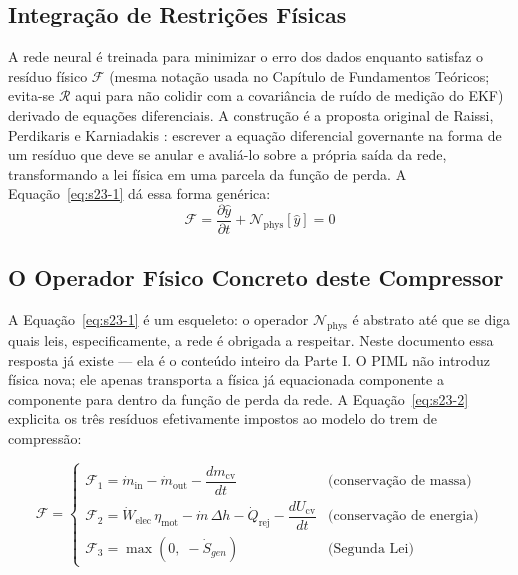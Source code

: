 \documentclass[12pt,a4paper]{article}
\numberwithin{equation}{section}
\numberwithin{table}{section}
\numberwithin{figure}{section}
\begin{document}
	\subsection{Integração de Restrições Físicas}
	A rede neural é treinada para minimizar o erro dos dados enquanto satisfaz o resíduo físico $\mathcal{F}$ (mesma notação usada no Capítulo de Fundamentos Teóricos; evita-se $\mathcal{R}$ aqui para não colidir com a covariância de ruído de medição do EKF) derivado de equações diferenciais. A construção é a proposta original de Raissi, Perdikaris e Karniadakis \cite{piml}: escrever a equação diferencial governante na forma de um resíduo que deve se anular e avaliá-lo sobre a própria saída da rede, transformando a lei física em uma parcela da função de perda. A Equação~\eqref{eq:s23-1} dá essa forma genérica:
	\begin{equation}\label{eq:s23-1}
 \mathcal{F} = \frac{\partial \hat{y}}{\partial t} + \mathcal{N}_{\text{phys}}[\hat{y}] = 0
\end{equation}

	\subsection{O Operador Físico Concreto deste Compressor}

	A Equação~\eqref{eq:s23-1} é um esqueleto: o operador $\mathcal{N}_{\text{phys}}$ é abstrato até que se diga quais leis, especificamente, a rede é obrigada a respeitar. Neste documento essa resposta já existe — ela é o conteúdo inteiro da Parte I. O PIML não introduz física nova; ele apenas transporta a física já equacionada componente a componente para dentro da função de perda da rede. A Equação~\eqref{eq:s23-2} explicita os três resíduos efetivamente impostos ao modelo do trem de compressão:

	\begin{equation}\label{eq:s23-2}
	\mathcal{F} = \begin{cases}
		\mathcal{F}_1 = \dot{m}_{\text{in}} - \dot{m}_{\text{out}} - \dfrac{dm_{\text{cv}}}{dt} & \text{(conservação de massa)} \\[10pt]
		\mathcal{F}_2 = \dot{W}_{\text{elec}}\,\eta_{\text{mot}} - \dot{m}\,\Delta h - \dot{Q}_{\text{rej}} - \dfrac{dU_{\text{cv}}}{dt} & \text{(conservação de energia)} \\[10pt]
		\mathcal{F}_3 = \max\left(0,\; -\dot{S}_{gen}\right) & \text{(Segunda Lei)}
	\end{cases}
\end{equation}
\end{document}
